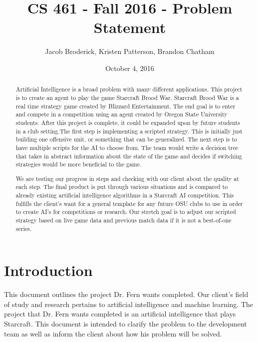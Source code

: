 \documentclass[10pt,letterpaper,onecolumn,draftclsnofoot]{IEEEtran}
\begin{document}
\begin{titlepage}
  \title{CS 461 - Fall 2016 - Problem Statement}
  \author{Jacob Broderick, Kristen Patterson, Brandon Chatham}
  \date{October 4, 2016}
  \maketitle
  \vspace{4cm}
  \begin{abstract}
  	\noindent 
  	Artificial Intelligence is a broad problem with many different applications. This project is to create an agent to play the game Starcraft Brood War. Starcraft Brood War is a real time strategy game created by Blizzard Entertainment. The end goal is to enter and compete in a competition using an agent created by Oregon State University students. After this project is complete, it could be expanded upon by future students in a club setting.The first step is implementing a scripted strategy. This is initially just building one offensive unit, or something that can be generalized. The next step is to have multiple scripts for the AI to choose from. The team would write a decision tree that takes in abstract information about the state of the game and decides if switching strategies would be more beneficial to the game.
  	
  	We are testing our progress in steps and checking with our client about the quality at each step. The final product is put through various situations and is compared to already existing artificial intelligence algorithms in a Starcraft AI competition. This fulfills the client's want for a general template for any future OSU clubs to use in order to create AI's for competitions or research. Our stretch goal is to adjust our scripted strategy based on live game data and previous match data if it is not a best-of-one series. 
  \end{abstract}
\end{titlepage}
\section{Introduction}
This document outlines the project Dr. Fern wants completed. Our client's field of study and research pertains to artificial intelligence and machine learning. The project that Dr. Fern wants completed is an artificial intelligence that plays Starcraft. This document is intended to clarify the problem to the development team as well as inform the client about how his problem will be solved.
\end{document}
